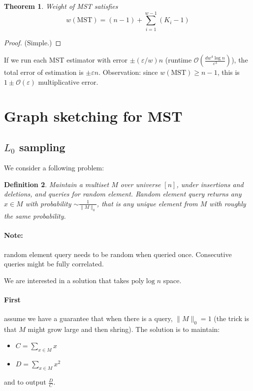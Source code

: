 \documentclass[11pt]{article}
\newtheorem{theorem}{Theorem}
\newtheorem{definition}[theorem]{Definition}
\newcommand{\bigo}{\mathcal{O}}
\begin{document}
\begin{theorem}
Weight of MST satisfies
$$w(\text{MST}) = (n-1) + \sum_{i=1}^{w-1} (K_i - 1)$$
\end{theorem}
\begin{proof} (Simple.)
\end{proof}


If we run each MST estimator with error $\pm (\varepsilon/w)n$ (runtime $\bigo(\frac{d w^4 \log n}{\varepsilon^3})$), the total error of estimation is $\pm \varepsilon n$. Observation: since $w(\text{MST}) \ge n-1$, this is $1\pm \bigo(\varepsilon)$ multiplicative error.


\section{Graph sketching for MST \cite{DBLP:conf/soda/KlauckNP015}}
\subsection{$L_0$ sampling}
We consider a following problem:
\begin{definition}
Maintain a multiset $M$ over universe $[n]$, under insertions and deletions, and queries for random element. Random element query returns any $x \in M$ with probability $\sim \frac{1}{\|M\|_0}$, that is any unique element from $M$ with roughly the same probability.
\end{definition}

\paragraph{Note:} random element query needs to be random when queried once. Consecutive queries might be fully correlated.

We are interested in a solution that takes $\text{poly} \log n$ space.

\paragraph{First} assume we have a guarantee that when there is a query, $\|M\|_0 = 1$ (the trick is that $M$ might grow large and then shring). The solution is to maintain:
\begin{itemize}
\item $C = \sum_{x \in M} x$
\item $D = \sum_{x \in M} x^2$
\end{itemize}
and to output $\frac{D}{C}$.
\end{document}
